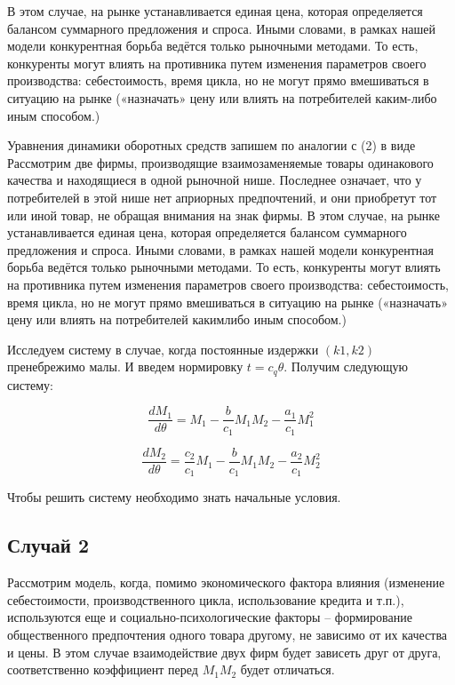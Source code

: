 \documentclass[
  12pt,
  a4paper,
]{scrreprt}
\begin{document}
В этом случае, на рынке устанавливается единая цена, которая
определяется балансом суммарного предложения и спроса. Иными словами, в
рамках нашей модели конкурентная борьба ведётся только рыночными
методами. То есть, конкуренты могут влиять на противника путем изменения
параметров своего производства: себестоимость, время цикла, но не могут
прямо вмешиваться в ситуацию на рынке («назначать» цену или влиять на
потребителей каким-либо иным способом.)

Уравнения динамики оборотных средств запишем по аналогии с (2) в виде
Рассмотрим две фирмы, производящие взаимозаменяемые товары одинакового
качества и находящиеся в одной рыночной нише. Последнее означает, что у
потребителей в этой нише нет априорных предпочтений, и они приобретут
тот или иной товар, не обращая внимания на знак фирмы. В этом случае, на
рынке устанавливается единая цена, которая определяется балансом
суммарного предложения и спроса. Иными словами, в рамках нашей модели
конкурентная борьба ведётся только рыночными методами. То есть,
конкуренты могут влиять на противника путем изменения параметров своего
производства: себестоимость, время цикла, но не могут прямо вмешиваться
в ситуацию на рынке («назначать» цену или влиять на потребителей
какимлибо иным способом.)

Исследуем систему в случае, когда постоянные издержки \((k1, k2)\)
пренебрежимо малы. И введем нормировку \(t=c_q\theta\). Получим
следующую систему:

\[
\dfrac{dM_1}{d\theta} = M_1 - \frac{b}{c_1}M_1M_2 - \frac{a_1}{c_1}M_1^2
\]

\[
\dfrac{dM_2}{d\theta} = \frac{c_2}{c_1}M_1 - \frac{b}{c_1}M_1M_2 - \frac{a_2}{c_1}M_2^2
\]

Чтобы решить систему необходимо знать начальные условия.

\hypertarget{ux441ux43bux443ux447ux430ux439-2}{%
\subsection{Случай 2}\label{ux441ux43bux443ux447ux430ux439-2}}

Рассмотрим модель, когда, помимо экономического фактора влияния
(изменение себестоимости, производственного цикла, использование кредита
и т.п.), используются еще и социально-психологические факторы –
формирование общественного предпочтения одного товара другому, не
зависимо от их качества и цены. В этом случае взаимодействие двух фирм
будет зависеть друг от друга, соответственно коэффициент перед
\(M_1M_2\) будет отличаться.
\end{document}
